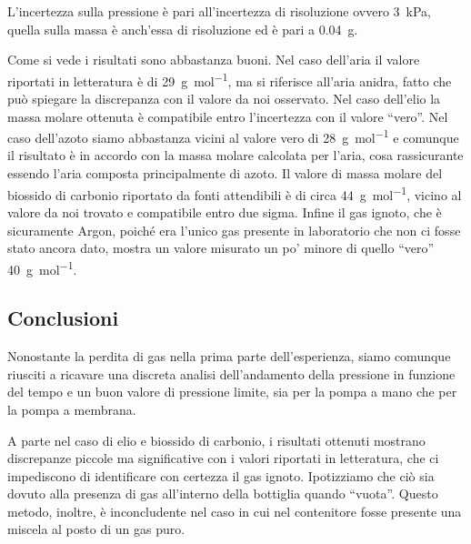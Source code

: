 L'incertezza sulla pressione è pari all'incertezza di risoluzione ovvero \SI{3}{\kilo\pascal}, quella sulla massa
è anch'essa di risoluzione ed è pari a \SI{0.04}{\gram}.

Come si vede i risultati sono abbastanza buoni. Nel caso dell'aria il valore riportati in letteratura è di \SI{29}{\gram\per\mole},
ma si riferisce all'aria anidra, fatto che può spiegare la discrepanza con il valore da noi osservato. Nel caso dell'elio
la massa molare ottenuta è compatibile entro l'incertezza con il valore ``vero''. Nel caso dell'azoto siamo
abbastanza vicini al valore vero di \SI{28}{\gram\per\mole} e comunque il risultato è in accordo con la massa molare calcolata per l'aria,
cosa rassicurante essendo l'aria composta principalmente di azoto. Il valore di massa molare del biossido di carbonio
riportato da fonti attendibili è di circa \SI{44}{\gram\per\mole}, vicino al valore da noi trovato e compatibile entro due sigma.
Infine il gas ignoto, che è sicuramente Argon, poiché era l'unico gas presente in laboratorio che non ci fosse stato
ancora dato, mostra un valore misurato un po' minore di quello ``vero'' \SI{40}{\gram\per\mole}.

\subsection{Conclusioni}

Nonostante la perdita di gas nella prima parte dell'esperienza, siamo comunque riusciti a ricavare una discreta analisi dell'andamento della pressione in funzione del tempo e un buon valore di pressione limite, sia per la pompa a mano che per la pompa a membrana.

A parte nel caso di elio e biossido di carbonio, i risultati ottenuti mostrano discrepanze piccole ma significative
con i valori riportati in letteratura, che ci impediscono di identificare con certezza il gas ignoto. Ipotizziamo che ciò sia dovuto alla presenza di gas all'interno
della bottiglia quando ``vuota''.
Questo metodo, inoltre, è inconcludente nel caso in cui nel contenitore fosse presente una miscela al posto di un gas puro.